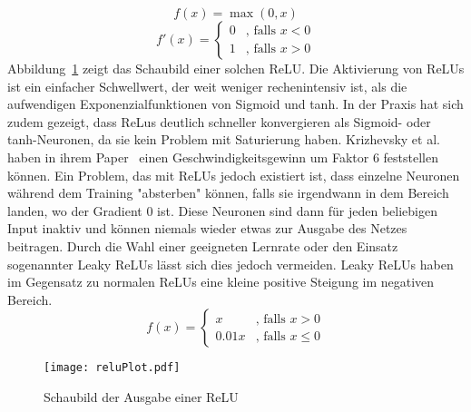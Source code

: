 \begin{equation}
	f(x) = \max(0, x)
\end{equation}
\begin{equation*}
	f'(x) = \begin{cases}
	0 &\text{, falls $x < 0$}\\
	1 &\text{, falls $x > 0$}
	\end{cases}
\end{equation*}
	Abbildung~\ref{reluoutput} zeigt das Schaubild einer solchen ReLU. 
	Die Aktivierung von ReLUs ist ein einfacher Schwellwert, der weit weniger rechenintensiv ist, als die aufwendigen Exponenzialfunktionen von Sigmoid und tanh.
	In der Praxis hat sich zudem gezeigt, dass ReLus deutlich schneller konvergieren als Sigmoid- oder tanh-Neuronen, da sie kein Problem mit Saturierung haben.
	Krizhevsky et al. haben in ihrem Paper~\cite{NIPS2012_4824} einen Geschwindigkeitsgewinn um Faktor 6 feststellen können.
	Ein Problem, das mit ReLUs jedoch existiert ist, dass einzelne Neuronen während dem Training "absterben" können, falls sie irgendwann in dem Bereich landen, wo der Gradient 0 ist.
	Diese Neuronen sind dann für jeden beliebigen Input inaktiv und können niemals wieder etwas zur Ausgabe des Netzes beitragen.
	Durch die Wahl einer geeigneten Lernrate oder den Einsatz sogenannter Leaky ReLUs lässt sich dies jedoch vermeiden.
	Leaky ReLUs haben im Gegensatz zu normalen ReLUs eine kleine positive Steigung im negativen Bereich.
	\begin{equation}
		f(x) = \begin{cases}
			x &\text{, falls } x  >  0\\
			0.01 x &\text{, falls } x  \leq  0
		\end{cases}
	\end{equation} 
	

	\begin{figure}[h]
		\centering
		\texttt{[image: reluPlot.pdf]}
		\caption{Schaubild der Ausgabe einer ReLU}
		\label{reluoutput}
	\end{figure}




